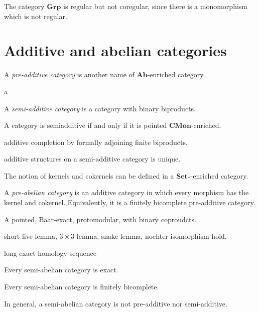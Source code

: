 \documentclass{../../large}
\newcommand{\Set}{\mathbf{Set}}
\newcommand{\CMon}{\mathbf{CMon}}
\newcommand{\Grp}{\mathbf{Grp}}
\newcommand{\Ab}{\mathbf{Ab}}
\begin{document}
The category $\Grp$ is regular but not coregular, since there is a monomorphism which is not regular.


\section{Additive and abelian categories}

\begin{prb}
A \emph{pre-additive category} is another name of $\Ab$-enriched category.
\begin{parts}
\item a
\end{parts}
\end{prb}

\begin{prb}
A \emph{semi-additive category} is a category with binary biproducts.
\begin{parts}
\item A category is semiadditive if and only if it is pointed $\CMon$-enriched.
\end{parts}
\end{prb}


\begin{prb}
\begin{parts}
\item additive completion by formally adjoining finite biproducts.
\item additive structures on a semi-additive category is unique.
\end{parts}
\end{prb}

The notion of kernels and cokernels can be defined in a $\Set_*$-enriched category.


\begin{prb}
A \emph{pre-abelian category} is an additive category in which every morphism has the kernel and cokernel.
Equivalently, it is a finitely bicomplete pre-additive category.
\begin{parts}
\item 
\end{parts}
\end{prb}

\begin{prb}
A pointed, Baar-exact, protomodular, with binary coproudcts.
\begin{parts}
\item short five lemma, $3\times3$ lemma, snake lemma, noehter isomorphism hold.
\item long exact homology sequence
\item Every semi-abelian category is exact.
\item Every semi-abelian category is finitely bicomplete.
\item In general, a semi-abelian category is not pre-additive nor semi-additive.
\end{parts}
\end{prb}
\end{document}
